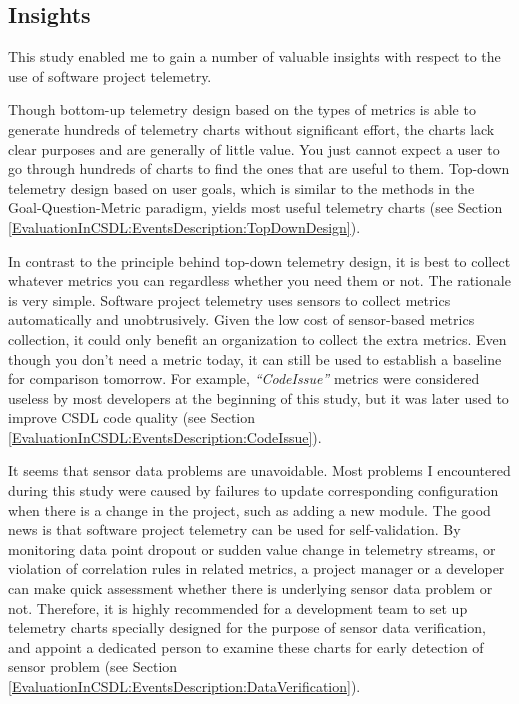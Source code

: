 





\subsection{Insights}

This study enabled me to gain a number of valuable insights with respect to the use of software project telemetry.

Though bottom-up telemetry design based on the types of metrics is able to generate hundreds of telemetry charts without significant effort, the charts lack clear purposes and are generally of little value. You just cannot expect a user to go through hundreds of charts to find the ones that are useful to them. Top-down telemetry design based on user goals, which is similar to the methods in the Goal-Question-Metric paradigm, yields most useful telemetry charts (see Section \ref{EvaluationInCSDL:EventsDescription:TopDownDesign}).

In contrast to the principle behind top-down telemetry design, it is best to collect whatever metrics you can regardless whether you need them or not. The rationale is very simple. Software project telemetry uses sensors to collect metrics automatically and unobtrusively. Given the low cost of sensor-based metrics collection, it could only benefit an organization to collect the extra metrics. Even though you don't need a metric today, it can still be used to establish a baseline for comparison tomorrow. For example, \textit{``CodeIssue''} metrics were considered useless by most developers at the beginning of this study, but it was later used to improve CSDL code quality (see Section \ref{EvaluationInCSDL:EventsDescription:CodeIssue}).

It seems that sensor data problems are unavoidable. Most problems I encountered during this study were caused by failures to update corresponding configuration when there is a change in the project, such as adding a new module. The good news is that software project telemetry can be used for self-validation. By monitoring data point dropout or sudden value change in telemetry streams, or violation of correlation rules in related metrics, a project manager or a developer can make quick assessment whether there is underlying sensor data problem or not. Therefore, it is highly recommended for a development team to set up telemetry charts specially designed for the purpose of sensor data verification, and appoint a dedicated person to examine these charts for early detection of sensor problem (see Section \ref{EvaluationInCSDL:EventsDescription:DataVerification}).

